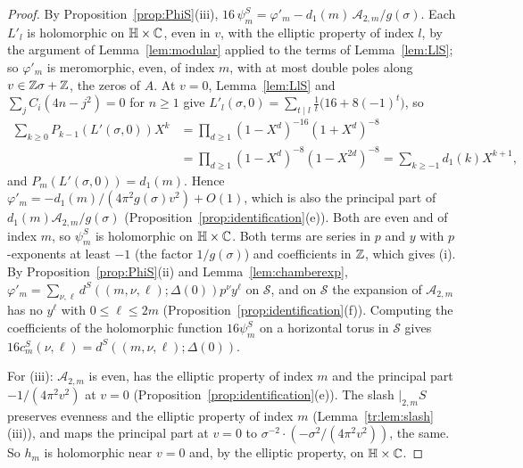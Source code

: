 \begin{proof}
By Proposition~\ref{prop:PhiS}(iii), $16\,\psi^S_m=\varphi'_m-d_1(m)\,\mathcal A_{2,m}/g(\sigma)$. Each $L'_l$ is holomorphic on $\mathbb H\times\mathbb{C}$, even in $v$, with the elliptic property of index $l$, by the argument of Lemma~\ref{lem:modular} applied to the terms of Lemma~\ref{lem:LlS}; so $\varphi'_m$ is meromorphic, even, of index $m$, with at most double poles along $v\in\mathbb{Z}\sigma+\mathbb{Z}$, the zeros of $A$. At $v=0$, Lemma~\ref{lem:LlS} and $\sum_jC_i(4n-j^2)=0$ for $n\ge1$ give $L'_l(\sigma,0)=\sum_{t\mid l}\frac1t\big(16+8(-1)^t\big)$, so
\begin{align*}
\sum_{k\ge0}P_{k-1}(L'(\sigma,0))X^k&=\prod_{d\ge1}(1-X^d)^{-16}(1+X^d)^{-8}\\
&=\prod_{d\ge1}(1-X^d)^{-8}(1-X^{2d})^{-8}=\sum_{k\ge-1}d_1(k)X^{k+1},
\end{align*}
and $P_m(L'(\sigma,0))=d_1(m)$. Hence $\varphi'_m=-d_1(m)/(4\pi^2g(\sigma)v^2)+O(1)$, which is also the principal part of $d_1(m)\mathcal A_{2,m}/g(\sigma)$ (Proposition~\ref{prop:identification}(e)). Both are even and of index $m$, so $\psi^S_m$ is holomorphic on $\mathbb H\times\mathbb{C}$. Both terms are series in $p$ and $y$ with $p$-exponents at least $-1$ (the factor $1/g(\sigma)$) and coefficients in $\mathbb{Z}$, which gives (i). By Proposition~\ref{prop:PhiS}(ii) and Lemma~\ref{lem:chamberexp}, $\varphi'_m=\sum_{\nu,\ell}d^S((m,\nu,\ell);\Delta(0))p^\nu y^\ell$ on $\mathcal S$, and on $\mathcal S$ the expansion of $\mathcal A_{2,m}$ has no $y^\ell$ with $0\le\ell\le2m$ (Proposition~\ref{prop:identification}(f)). Computing the coefficients of the holomorphic function $16\psi^S_m$ on a horizontal torus in $\mathcal S$ gives $16c^S_m(\nu,\ell)=d^S((m,\nu,\ell);\Delta(0))$.

For (iii): $\mathcal A_{2,m}$ is even, has the elliptic property of index $m$ and the principal part $-1/(4\pi^2v^2)$ at $v=0$ (Proposition~\ref{prop:identification}(e)). The slash $|_{2,m}S$ preserves evenness and the elliptic property of index $m$ (Lemma~\ref{tr:lem:slash}(iii)), and maps the principal part at $v=0$ to $\sigma^{-2}\cdot(-\sigma^2/(4\pi^2v^2))$, the same. So $h_m$ is holomorphic near $v=0$ and, by the elliptic property, on $\mathbb H\times\mathbb{C}$.
\end{proof}

